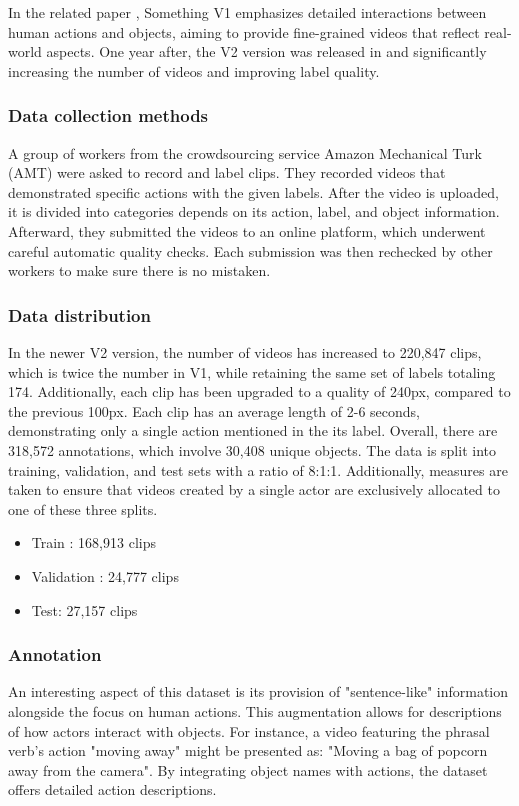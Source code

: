 \documentclass[10pt,onecolumn,letterpaper]{article}
\begin{document}
In the related paper \cite{somethingsomething}, Something V1 emphasizes detailed interactions between human actions and objects, aiming to provide fine-grained videos that reflect real-world aspects. One year after, the V2 version was released in \cite{Somethingv2} and significantly increasing the number of videos and improving label quality.
\subsubsection{Data collection methods}
A group of workers from the crowdsourcing service Amazon Mechanical Turk (AMT) were asked to record and label clips. They recorded videos that demonstrated specific actions with the given labels. After the video is uploaded, it is divided into categories depends on its action, label, and object information. Afterward, they submitted the videos to an online platform, which underwent careful automatic quality checks. Each submission was then rechecked by other workers to make sure there is no mistaken.
\subsubsection{Data distribution}
In the newer V2 version, the number of videos has increased to 220,847 clips, which is twice the number in V1, while retaining the same set of labels totaling 174. Additionally, each clip has been upgraded to a quality of 240px, compared to the previous 100px. Each clip has an average length of 2-6 seconds, demonstrating only a single action mentioned in the its label. Overall, there are 318,572 annotations, which involve 30,408 unique objects. The data is split into training, validation, and test sets with a ratio of 8:1:1. Additionally, measures are taken to ensure that videos created by a single actor are exclusively allocated to one of these three splits. 
\begin{itemize}
	\item Train : 168,913 clips
	\item Validation : 24,777 clips
	\item Test: 27,157 clips
\end{itemize}

\subsubsection{Annotation}

An interesting aspect of this dataset is its provision of "sentence-like" information alongside the focus on human actions. This augmentation allows for descriptions of how actors interact with objects. For instance, a video featuring the phrasal verb's action "moving away" might be presented as: "Moving a bag of popcorn away from the camera". By integrating object names with actions, the dataset offers detailed action descriptions. 
\end{document}

